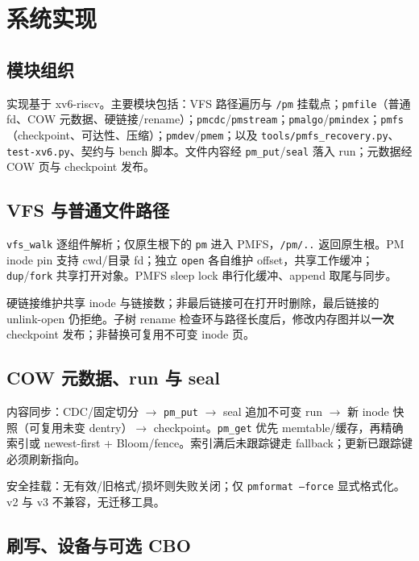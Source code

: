 \chapter{系统实现}
\label{chap:impl}

\section{模块组织}

实现基于 xv6-riscv。主要模块包括：VFS 路径遍历与 \texttt{/pm} 挂载点；\texttt{pmfile}（普通 fd、COW 元数据、硬链接/rename）；\texttt{pmcdc}/\texttt{pmstream}；\texttt{pmalgo}/\texttt{pmindex}；\texttt{pmfs}（checkpoint、可达性、压缩）；\texttt{pmdev}/\texttt{pmem}；以及 \texttt{tools/pmfs\_recovery.py}、\texttt{test-xv6.py}、契约与 bench 脚本。文件内容经 \texttt{pm\_put}/\texttt{seal} 落入 run；元数据经 COW 页与 checkpoint 发布。

\section{VFS 与普通文件路径}

\texttt{vfs\_walk} 逐组件解析；仅原生根下的 \texttt{pm} 进入 PMFS，\texttt{/pm/..} 返回原生根。PM inode pin 支持 cwd/目录 fd；独立 \texttt{open} 各自维护 offset，共享工作缓冲；\texttt{dup}/\texttt{fork} 共享打开对象。PMFS sleep lock 串行化缓冲、append 取尾与同步。

硬链接维护共享 inode 与链接数；非最后链接可在打开时删除，最后链接的 unlink-open 仍拒绝。子树 rename 检查环与路径长度后，修改内存图并以\textbf{一次} checkpoint 发布；非替换可复用不可变 inode 页。

\section{COW 元数据、run 与 seal}

内容同步：CDC/固定切分 $\rightarrow$ \texttt{pm\_put} $\rightarrow$ seal 追加不可变 run $\rightarrow$ 新 inode 快照（可复用未变 dentry）$\rightarrow$ checkpoint。\texttt{pm\_get} 优先 memtable/缓存，再精确索引或 newest-first + Bloom/fence。索引满后未跟踪键走 fallback；更新已跟踪键必须刷新指向。

安全挂载：无有效/旧格式/损坏则失败关闭；仅 \texttt{pmformat --force} 显式格式化。v2 与 v3 不兼容，无迁移工具。

\section{刷写、设备与可选 CBO}

